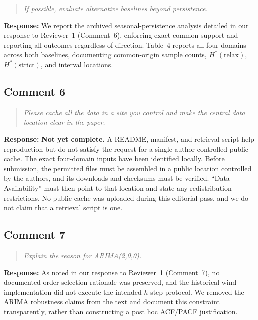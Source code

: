 \documentclass[11pt,a4paper]{article}
\newenvironment{reviewcomment}
  {\begin{quote}\itshape}
  {\end{quote}}
\newcommand{\response}{\noindent\textbf{Response:} }
\begin{document}
\begin{reviewcomment}
If possible, evaluate alternative baselines beyond persistence.
\end{reviewcomment}

\response
We report the archived seasonal-persistence analysis
detailed in our response to Reviewer~1 (Comment~6), enforcing exact common
support and reporting all outcomes regardless of direction. Table~4 reports
all four domains across both baselines, documenting common-origin sample
counts, $H^*(\mathrm{relax})$, $H^*(\mathrm{strict})$, and interval locations.


\subsection*{Comment 6}

\begin{reviewcomment}
Please cache all the data in a site you control and make the central
data location clear in the paper.
\end{reviewcomment}

\response
\textbf{Not yet complete.} A README, manifest, and retrieval script help
reproduction but do not satisfy the request for a single author-controlled
public cache. The exact four-domain inputs have been identified locally.
Before submission, the permitted files must be assembled in a public
location controlled by the authors, and its downloads and checksums must
be verified. ``Data Availability'' must then point to that location and
state any redistribution restrictions. No public cache was uploaded during
this editorial pass, and we do not claim that a retrieval script is one.


\subsection*{Comment 7}

\begin{reviewcomment}
Explain the reason for ARIMA(2,0,0).
\end{reviewcomment}

\response
As noted in our response to Reviewer~1 (Comment~7), no documented
order-selection rationale was preserved, and the historical wind implementation
did not execute the intended $h$-step protocol. We removed the ARIMA robustness
claims from the text and document this constraint transparently, rather than
constructing a post hoc ACF/PACF justification.
\end{document}
